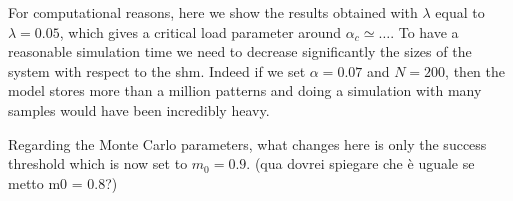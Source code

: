 \documentclass[\rootdir/main.tex]{subfiles}
\begin{document}
For computational reasons, here we show the results obtained with $\lambda$ equal to $\lambda = 0.05$, which gives a critical load parameter around $\alpha_c \simeq \dots$. To have a reasonable simulation time we need to decrease significantly the sizes of the system with respect to the \acrlong{shm}. Indeed if we set $\alpha = 0.07$ and $N = 200$, then the model stores more than a million patterns and doing a simulation with many samples would have been incredibly heavy. 

Regarding the Monte Carlo parameters, what changes here is only the success threshold which is now set to $m_0 = 0.9$. (qua dovrei spiegare che è uguale se metto m0 = 0.8?)


\subbibliography
\end{document}
